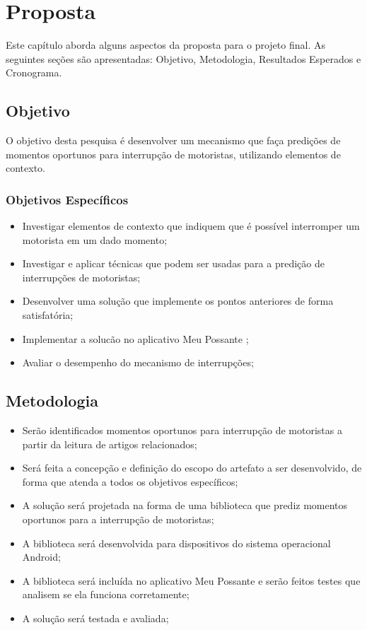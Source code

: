 \chapter{Proposta}
\label{proposta}
Este capítulo aborda alguns aspectos da proposta para o projeto final. As seguintes seções são apresentadas:
Objetivo, Metodologia, Resultados Esperados e Cronograma.

\section{Objetivo}
\label{objetivo}
O objetivo desta pesquisa é desenvolver um mecanismo que faça predições de momentos oportunos para interrupção de
motoristas, utilizando elementos de contexto.

\subsection{Objetivos Específicos}
\label{objetivos-esp}
\begin{itemize}
  \item Investigar elementos de contexto que indiquem que é possível interromper um motorista em um dado momento;
  \item Investigar e aplicar técnicas que podem ser usadas para a predição de interrupções de motoristas;
  \item Desenvolver uma solução que implemente os pontos anteriores de forma satisfatória;
  \item Implementar a solucão no aplicativo Meu Possante \cite{meupossante};
  \item Avaliar o desempenho do mecanismo de interrupções;
\end{itemize}

\section{Metodologia}
\label{metodologia}
\begin{itemize}
  \item Serão identificados momentos oportunos para interrupção de motoristas a partir da leitura de artigos
    relacionados;
  \item Será feita a concepção e definição do escopo do artefato a ser desenvolvido, de forma que atenda a
    todos os objetivos específicos;
  \item A solução será projetada na forma de uma biblioteca que prediz momentos oportunos para a interrupção
    de motoristas;
  \item A biblioteca será desenvolvida para dispositivos do sistema operacional Android;
  \item A biblioteca será incluída no aplicativo Meu Possante \cite{meupossante} e serão feitos testes que analisem se ela funciona
    corretamente;
  \item A solução será testada e avaliada;
\end{itemize}

